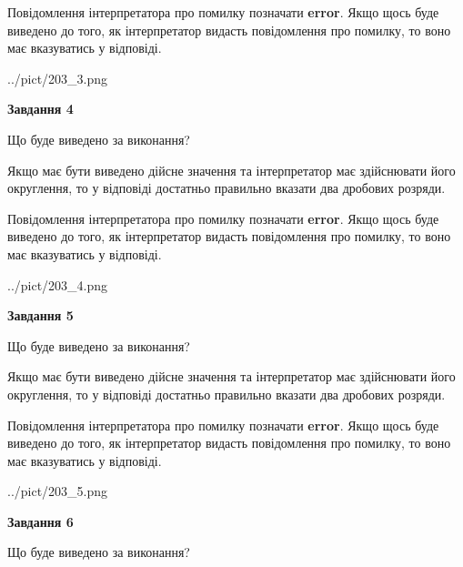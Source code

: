 \documentclass[12pt, ukrainian]{article}
\begin{document}
{\begin {Large}
Повідомлення інтерпретатора про помилку позначати \textbf{error}.
Якщо щось буде виведено до того, як інтерпретатор видасть повідомлення про помилку, 
то воно має вказуватись у відповіді. \par

\begin{center}
	{../pict/203_3.png}
\end{center}
\newpage

{\begin {center}\textbf{Завдання 4}\end {center}}\par
Що буде виведено за виконання? \par

Якщо має бути виведено дійсне значення та інтерпретатор має здійснювати його округлення, 
то у відповіді достатньо правильно вказати два дробових розряди.

Повідомлення інтерпретатора про помилку позначати \textbf{error}.
Якщо щось буде виведено до того, як інтерпретатор видасть повідомлення про помилку, 
то воно має вказуватись у відповіді. \par

\begin{center}
	{../pict/203_4.png}
\end{center}
\newpage

{\begin {center}\textbf{Завдання 5}\end {center}}\par
Що буде виведено за виконання? \par

Якщо має бути виведено дійсне значення та інтерпретатор має здійснювати його округлення, 
то у відповіді достатньо правильно вказати два дробових розряди.

Повідомлення інтерпретатора про помилку позначати \textbf{error}.
Якщо щось буде виведено до того, як інтерпретатор видасть повідомлення про помилку, 
то воно має вказуватись у відповіді. \par

\begin{center}
	{../pict/203_5.png}
\end{center}
\newpage

{\begin {center}\textbf{Завдання 6}\end {center}}\par
Що буде виведено за виконання? \par


\end{Large}}
\end{document}
